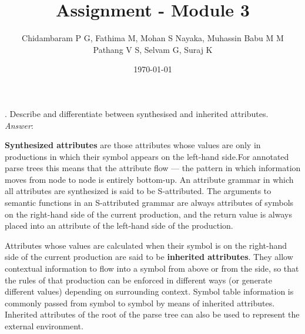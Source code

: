 \documentclass[a4paper,12pt]{article}
\begin{document}
\title{Assignment - Module 3}
\date{\today}
\author{Chidambaram P G, Fathima M, Mohan S Nayaka, Muhassin Babu M M\\ Pathang V S, Selvam G, Suraj K}
\maketitle
{}. Describe and differentiate between synthesised and inherited attributes.\\
\emph{Answer}:

\textbf{Synthesized attributes} are those attributes whose values are only in productions in which their symbol appears on the left-hand side.For annotated parse trees this means that the attribute flow --- the pattern in
which information moves from node to node is entirely bottom-up.    An attribute grammar in which all attributes are synthesized is said to be S-attributed. The arguments to semantic functions in an S-attributed grammar are always attributes of symbols on the right-hand side of the current production, and the return value is always placed into an attribute of the left-hand
side of the production.

Attributes whose values are calculated when their symbol is on the right-hand side of the current production are said to be \textbf{inherited attributes}. They allow contextual information to flow into a symbol from above or from the side, so that the rules of that production can be enforced in different ways (or generate different values) depending on surrounding context. Symbol table information is commonly passed from symbol to symbol by means of inherited attributes. Inherited attributes of the root of the parse tree can also be used to represent the external environment.\\
\end{document}
